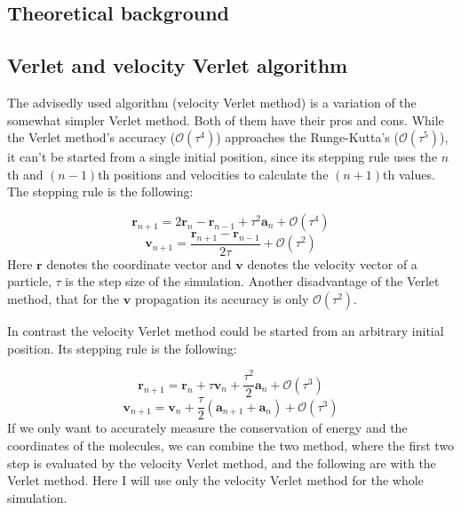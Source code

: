 \begin{multicols}{2}
\section{Theoretical background}
\subsection{Verlet and velocity Verlet algorithm}
The advisedly used algorithm (velocity Verlet method) is a variation of the somewhat simpler Verlet method. Both of them have their pros and cons. While the Verlet method's accuracy ($\mathcal{O} \left( \tau^{4} \right)$) approaches the Runge-Kutta's ($\mathcal{O} \left( \tau^{5} \right)$), it can't be started from a single initial position, since its stepping rule uses the $n$th and $(n-1)$th positions and velocities to calculate the $(n+1)$th values. The stepping rule is the following:

\begin{equation}
\boldsymbol{r}_{n+1}
=
2 \boldsymbol{r}_{n} - \boldsymbol{r}_{n-1} + \tau^{2} \boldsymbol{a}_{n} + \mathcal{O} \left( \tau^{4} \right)
\end{equation}
\begin{equation}
\boldsymbol{v}_{n+1}
=
\frac{\boldsymbol{r}_{n+1} - \boldsymbol{r}_{n-1}}{2 \tau} +  \mathcal{O} \left( \tau^{2} \right)
\end{equation}
Here $\boldsymbol{r}$ denotes the coordinate vector and $\boldsymbol{v}$ denotes the velocity vector of a particle, $\tau$ is the step size of the simulation. Another disadvantage of the Verlet method, that for the $\boldsymbol{v}$ propagation its accuracy is only $\mathcal{O} \left( \tau^{2} \right)$. \par
In contrast the velocity Verlet method could be started from an arbitrary initial position. Its stepping rule is the following:

\begin{equation}
\boldsymbol{r}_{n+1}
=
\boldsymbol{r}_{n} + \tau \boldsymbol{v}_{n} + \frac{\tau^{2}}{2} \boldsymbol{a}_{n} + \mathcal{O} \left( \tau^{3} \right)
\end{equation}
\begin{equation}
\boldsymbol{v}_{n+1}
=
\boldsymbol{v}_{n} + \frac{\tau}{2} \left( \boldsymbol{a}_{n+1} + \boldsymbol{a}_{n} \right) + \mathcal{O} \left( \tau^{3} \right)
\end{equation}
If we only want to accurately measure the conservation of energy and the coordinates of the molecules, we can combine the two method, where the first two step is evaluated by the velocity Verlet method, and the following are with the Verlet method. Here I will use only the velocity Verlet method for the whole simulation.


\end{multicols}
